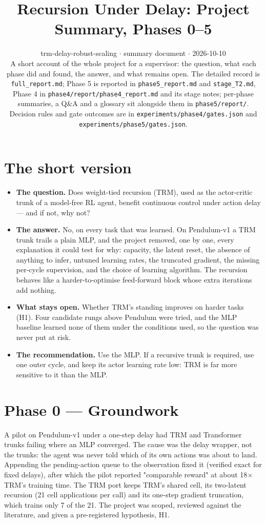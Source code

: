 \documentclass[11pt]{article}
\title{Recursion Under Delay: Project Summary, Phases 0--5}
\author{}
\date{trm-delay-robust-scaling $\cdot$ summary document $\cdot$ 2026-10-10\\[2pt]A short account of the whole project for a supervisor: the question, what each phase did and found, the answer, and what remains open. The detailed record is \texttt{full\_\allowbreak{}report.\allowbreak{}md}; Phase 5 is reported in \texttt{phase5\_\allowbreak{}report.\allowbreak{}md} and \texttt{stage\_T2.md}, Phase 4 in \texttt{phase4/\allowbreak{}report/\allowbreak{}phase4\_\allowbreak{}report.\allowbreak{}md} and its stage notes; per-phase summaries, a Q\&A and a glossary sit alongside them in \texttt{phase5/\allowbreak{}report/\allowbreak{}}. Decision rules and gate outcomes are in \texttt{experiments/\allowbreak{}phase4/\allowbreak{}gates.\allowbreak{}json} and \texttt{experiments/\allowbreak{}phase5/\allowbreak{}gates.\allowbreak{}json}.}
\begin{document}
\maketitle
\section*{The short version}



\begin{itemize}
\item \textbf{The question.} Does weight-tied recursion (TRM), used as the actor-critic trunk of a model-free RL agent, benefit continuous control under action delay --- and if not, why not?
\item \textbf{The answer.} No, on every task that was learned. On Pendulum-v1 a TRM trunk trails a plain MLP, and the project removed, one by one, every explanation it could test for why: capacity, the latent reset, the absence of anything to infer, untuned learning rates, the truncated gradient, the missing per-cycle supervision, and the choice of learning algorithm. The recursion behaves like a harder-to-optimise feed-forward block whose extra iterations add nothing.
\item \textbf{What stays open.} Whether TRM's standing improves on harder tasks (H1). Four candidate rungs above Pendulum were tried, and the MLP baseline learned none of them under the conditions used, so the question was never put at risk.
\item \textbf{The recommendation.} Use the MLP. If a recursive trunk is required, use one outer cycle, and keep its actor learning rate low: TRM is far more sensitive to it than the MLP.
\end{itemize}



\medskip



\section*{Phase 0 --- Groundwork}



A pilot on Pendulum-v1 under a one-step delay had TRM and Transformer trunks failing where an MLP converged. The cause was the delay wrapper, not the trunks: the agent was never told which of its own actions was about to land. Appending the pending-action queue to the observation fixed it (verified exact for fixed delays), after which the pilot reported "comparable reward" at about 18$\times$ TRM's training time. The TRM port keeps TRM's shared cell, its two-latent recursion (21 cell applications per call) and its one-step gradient truncation, which trains only 7 of the 21. The project was scoped, reviewed against the literature, and given a pre-registered hypothesis, H1.
\end{document}
